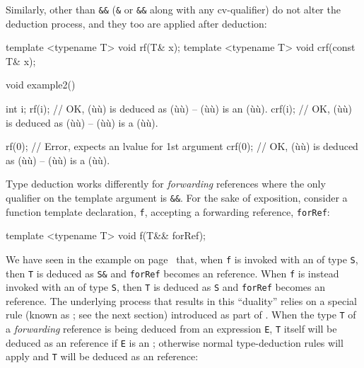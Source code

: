 \noindent Similarly,  other than \lstinline!&&!
(\lstinline!&! or \lstinline!&&! along with any cv-qualifier) do not
alter the deduction process, and they too are applied after deduction:

\begin{emcppslisting}
template <typename T> void rf(T& x);
template <typename T> void crf(const T& x);

void example2()
{
    int i;
    rf(i);   // OK, (ù{}ù) is deduced as (ù{}ù) -- (ù{}ù) is an (ù{}ù).
    crf(i);  // OK, (ù{}ù) is deduced as (ù{}ù) -- (ù{}ù) is a (ù{}ù).

    rf(0);   // Error, expects an lvalue for 1st argument
    crf(0);  // OK, (ù{}ù) is deduced as (ù{}ù) -- (ù{}ù) is a (ù{}ù).
}
\end{emcppslisting}

\noindent Type deduction works differently for \emph{forwarding} references
where the only qualifier on the template argument is \lstinline!&&!. For
the sake of exposition, consider a function template declaration,
\lstinline!f!, accepting a forwarding reference, \lstinline!forRef!:

\begin{emcppslisting}[emcppsbatch=e3]
template <typename T> void f(T&& forRef);
\end{emcppslisting}

\noindent We have seen in the example on page~\pageref{f-invoked-example} that,
when \lstinline!f! is invoked with an
 of type \lstinline!S!, then \lstinline!T! is deduced as
\lstinline!S&! and \lstinline!forRef! becomes an  reference.
When \lstinline!f! is instead invoked with an  of type
\lstinline!S!, then \lstinline!T! is deduced as \lstinline!S! and
\lstinline!forRef! becomes an  reference. The underlying
process that results in this ``duality'' relies on a special rule (known
as ; see the next section) introduced as part of
. When the type \lstinline!T! of a
\emph{forwarding} reference is being deduced from an expression
\lstinline!E!, \lstinline!T! itself will be deduced as an 
reference if \lstinline!E! is an ; otherwise normal
type-deduction rules will apply and \lstinline!T! will be deduced as an 
reference:


